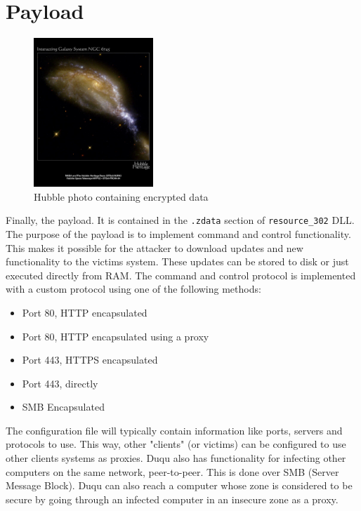 \documentclass[11pt,english,a4paper]{report}
\begin{document}
\section{Payload} \label{payload}
\begin{figure} 
  \centering
  \includegraphics[width=0.40\textwidth]{hubble_duqu.jpg} 
  \caption[Hubble photo containing encrypted data]
   {Hubble photo containing encrypted data \cite{DUQU_SYMANTEC}}
   \label{hubble}
\end{figure}
Finally, the payload. It is contained in the \texttt{.zdata} section of \texttt{resource\_302} DLL. The purpose of the payload is to implement command and control functionality. This makes it possible for the attacker to download updates and new functionality to the victims system. These updates can be stored to disk or just executed directly from RAM. The command and control protocol is implemented with a custom protocol using one of the following methods:
\begin{itemize}
  \item Port 80, HTTP encapsulated
  \item Port 80, HTTP encapsulated using a proxy
  \item Port 443, HTTPS encapsulated
  \item Port 443, directly
  \item SMB Encapsulated
\end{itemize}
The configuration file will typically contain information like ports, servers and protocols to use. This way, other "clients" (or victims) can be configured to use other clients systems as proxies. Duqu also has functionality for infecting other computers on the same network, peer-to-peer. This is done over SMB (Server Message Block). Duqu can also reach a computer whose zone is considered to be secure by going through an infected computer in an insecure zone as a proxy. 
\end{document}
